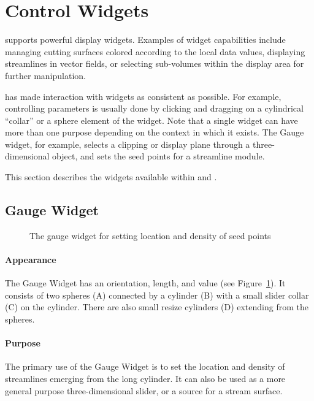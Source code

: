 \section{Control Widgets}
\label{sec:view-widgets} 

\SR{} supports powerful display widgets.  Examples of widget
capabilities include managing cutting surfaces colored according to
the local data values, displaying streamlines in vector fields, or
selecting sub-volumes within the display area for further
manipulation.
 
\sci{} has made interaction with widgets as consistent as
possible. For example, controlling parameters is usually done by
clicking and dragging on a cylindrical ``collar'' or a sphere element
of the widget. Note that a single widget can have more than one
purpose depending on the context in which it exists. The Gauge widget,
for example, selects a clipping or display plane through a
three-dimensional object, and sets the seed points for a streamline
module.

This section describes the widgets available within \SR{} and \BIOPSE{}.
 
\subsection{Gauge Widget}
\label{sec:view-gaugewidget} 

\begin{figure}[htb]
  \begin{makeimage}
  \end{makeimage}
  \gaugewidget
  \caption{\label{fig:gaugewidget} The gauge widget for setting location and
    density of seed points}
\end{figure}

\paragraph{Appearance} The Gauge
Widget has an orientation, length, and value (see Figure~\ref{fig:gaugewidget}). It consists of two spheres (A) connected by a cylinder (B) with a
small slider collar (C) on the cylinder.  There are also small resize
cylinders (D) extending from the spheres.

\paragraph{Purpose} The primary use of the Gauge Widget is to set the
location and density of streamlines emerging from the long cylinder.  It
can also be used as a more general purpose three-dimensional slider, or a
source for a stream surface. 

